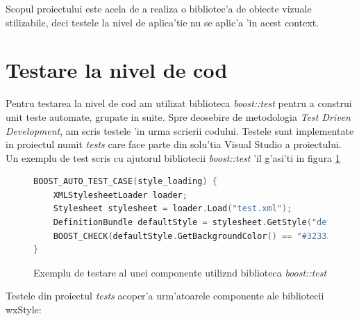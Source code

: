 Scopul proiectului este acela de a realiza o bibliotec'a de obiecte vizuale stilizabile, deci testele la nivel de aplica'tie nu se aplic'a 'in acest context.

\section{Testare la nivel de cod}

Pentru testarea la nivel de cod am utilizat biblioteca \emph{boost::test} pentru a construi unit teste automate, grupate in suite. Spre deosebire de metodologia \emph{Test Driven Development}, am scris testele 'in urma scrierii codului. Testele sunt implementate in proiectul numit \emph{tests} care face parte din solu'tia Visual Studio a proiectului. Un exemplu de test scris cu ajutorul bibliotecii \emph{boost::test} 'il g'asi'ti in figura \ref{fig0601}

\begin{figure}[H]
\begin{lstlisting}[language=C++]
BOOST_AUTO_TEST_CASE(style_loading) {
    XMLStylesheetLoader loader;
    Stylesheet stylesheet = loader.Load("test.xml");
    DefinitionBundle defaultStyle = stylesheet.GetStyle("default").GetBundle(Style::CAT_DEFAULT);
    BOOST_CHECK(defaultStyle.GetBackgroundColor() == "#323335");
}
\end{lstlisting}
\caption{Exemplu de testare al unei componente utiliz{\ia}nd biblioteca \emph{boost::test}}
\label{fig0601}
\end{figure}

Testele din proiectul \emph{tests} acoper'a urm'atoarele componente ale bibliotecii wxStyle:

